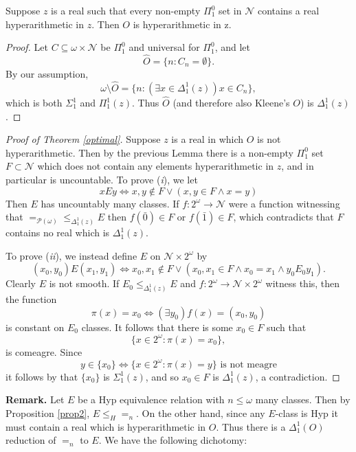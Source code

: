\documentclass[11pt, english]{article}
\newcommand{\baire}{\mathscr N}
\begin{document}
\begin{lemma}
Suppose $z$ is a real such that every non-empty $\Pi^0_1$ set in
$\baire$ contains a real hyperarithmetic in $z$. Then $O$ is
hyperarithmetic in z.
\end{lemma}
\begin{proof}
Let $C\subseteq\omega\times \baire$ be $\Pi^0_1$ and universal for
$\Pi^0_1$, and let
$$
\hat O=\{n: C_n=\emptyset\}.
$$
By our assumption,
$$
\omega \setminus \hat O=\{n:(\exists x\in\Delta_1^1(z)) x\in
C_n\},
$$
which is both $\Sigma^1_1$ and $\Pi^1_1(z)$. Thus $\hat O$ (and
therefore also Kleene's $O$) is $\Delta_1^1(z)$.
\end{proof}

\begin{proof}[Proof of Theorem \ref{optimal}]
Suppose $z$ is a real in which $O$ is not hyperarithmetic. Then by
the previous Lemma there is a non-empty $\Pi^0_1$ set
$F\subset\baire$ which does not contain any elements
hyperarithmetic in $z$, and in particular is uncountable. To prove
({\it i}), we let
$$
xEy\iff x,y\notin F\vee (x,y\in F\wedge x=y)
$$
Then $E$ has uncountably many classes. If $f:2^\omega\to\baire$
were a function witnessing that $=_{\mathcal{P}(\omega)}\leq_{\Delta^1_1(z)}
E$ then $f(\bar 0)\in F$ or $f(\bar 1)\in F$, which contradicts
that $F$ contains no real which is $\Delta^1_1(z)$.

To prove ({\it ii}), we instead define $E$ on $\baire\times
2^\omega$ by
$$
(x_0,y_0)E(x_1,y_1)\iff x_0,x_1\notin F\vee (x_0,x_1\in F\wedge
x_0=x_1\wedge y_0 E_0 y_1).
$$
Clearly $E$ is not smooth. If $E_0\leq_{\Delta^1_1(z)} E$ and
$f:2^\omega\to\baire\times 2^\omega$ witness this, then the
function
$$
\pi(x)=x_0\iff (\exists y_0) f(x)=(x_0,y_0)
$$
is constant on $E_0$ classes. It follows that there is some
$x_0\in F$ such that
$$
\{x\in 2^\omega: \pi(x)=x_0\},
$$
is comeagre. Since
$$
y\in\{x_0\}\iff \{x\in 2^\omega: \pi(x)=y\}\text{ is not meagre}
$$
it follows by \cite[Theorem 2.2.5]{kechris73} that $\{x_0\}$ is
$\Sigma^1_1(z)$, and so $x_0\in F$ is $\Delta^1_1(z)$, a
contradiction.
\end{proof}

\bigskip

\noindent \textbf{Remark.} Let $E$ be a Hyp equivalence relation
with $n\leq\omega$ many classes. Then by Proposition \ref{prop2},
$E\leq_{H} =_n$. On the other hand, since any $E$-class is Hyp it
must contain a real which is hyperarithmetic in $O$. Thus there is a
$\Delta_1^1(O)$ reduction of $=_n$ to $E$. We have the following
dichotomy:
\end{document}

